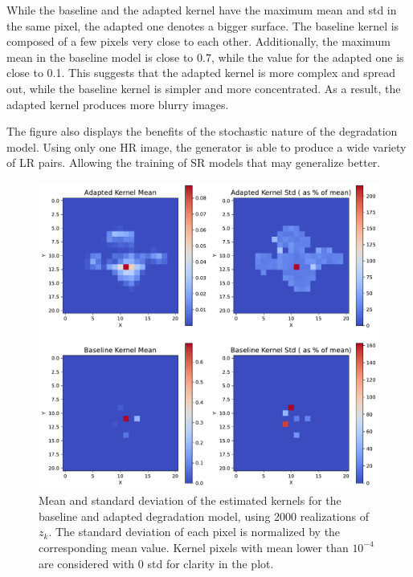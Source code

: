         While the baseline and the adapted kernel have the maximum mean and std in the same pixel, the adapted one denotes a bigger surface.  
        The baseline kernel is composed of a few pixels very close to each other.
        Additionally, the maximum mean in the baseline model is close to 0.7, while the value for the adapted one is close to 0.1.
        This suggests that the adapted kernel is more complex and spread out, while the baseline kernel is simpler and more concentrated.
        As a result, the adapted kernel produces more blurry images.
        
        The figure also displays the benefits of the stochastic nature of the degradation model.
        Using only one HR image, the generator is able to produce a wide variety of LR pairs. Allowing the training of SR models that may generalize better.

        \begin{figure}[H]
            \centering
            \includegraphics[width=\textwidth]{Includes/5-source-kernel-mean-std.pdf}
            \caption{Mean and standard deviation of the estimated kernels for the baseline and adapted degradation model, using 2000 realizations of $z_k$.
                     The standard deviation of each pixel is normalized by the corresponding mean value. Kernel pixels with mean lower than $10^{-4}$ are considered with 0 std for clarity in the plot.}
            \label{fig:5-source-kernel-mean-std}
        \end{figure}

